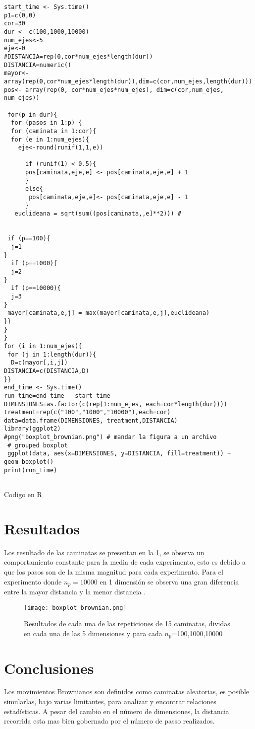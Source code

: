 \documentclass{article}
\renewcommand\lstlistingname{Código}
\begin{document}
\begin{listing}
\renewcommand\lstlistingname{Código}
\begin{verbatim}
start_time <- Sys.time()
p1=c(0,0)
cor=30
dur <- c(100,1000,10000)
num_ejes<-5
eje<-0
#DISTANCIA=rep(0,cor*num_ejes*length(dur))
DISTANCIA=numeric()
mayor<-array(rep(0,cor*num_ejes*length(dur)),dim=c(cor,num_ejes,length(dur)))
pos<- array(rep(0, cor*num_ejes*num_ejes), dim=c(cor,num_ejes, num_ejes))
 
 for(p in dur){
  for (pasos in 1:p) {
  for (caminata in 1:cor){
  for (e in 1:num_ejes){
    eje<-round(runif(1,1,e))
     
      if (runif(1) < 0.5){
      pos[caminata,eje,e] <- pos[caminata,eje,e] + 1
      }
      else{
       pos[caminata,eje,e]<- pos[caminata,eje,e] - 1
      }
   euclideana = sqrt(sum((pos[caminata,,e]**2))) # 
   
   
 if (p==100){
  j=1
}
  if (p==1000){
  j=2
}
  if (p==10000){
  j=3
}
 mayor[caminata,e,j] = max(mayor[caminata,e,j],euclideana)
}} 
}
}
for (i in 1:num_ejes){
 for (j in 1:length(dur)){
  D=c(mayor[,i,j])
DISTANCIA=c(DISTANCIA,D)
}}
end_time <- Sys.time()
run_time=end_time - start_time
DIMENSIONES=as.factor(c(rep(1:num_ejes, each=cor*length(dur))))
treatment=rep(c("100","1000","10000"),each=cor)
data=data.frame(DIMENSIONES, treatment,DISTANCIA)
library(ggplot2)
#png("boxplot_brownian.png") # mandar la figura a un archivo
 # grouped boxplot
 ggplot(data, aes(x=DIMENSIONES, y=DISTANCIA, fill=treatment)) +
geom_boxplot()
print(run_time)


\end{verbatim}
\caption{Codigo en R}
\label{listing:1}
\end{listing}
\section{Resultados}
Los resultado de las caminatas se presentan en la \ref{CBP_1}, se observa un comportamiento constante para la media de cada experimento, esto es debido a que los pasos son de la misma magnitud para cada experimento. Para el experimento donde $n_p=10000$ en 1 dimensión se observa una gran diferencia entre la mayor distancia y la menor distancia  .
\begin{figure}[h] %
    \centering
    \texttt{[image: boxplot\_brownian.png]} %
    \caption{Resultados de cada una de las repeticiones de 15 caminatas, dividas en cada una de las 5 dimensiones y para cada $n_p$=100,1000,10000 }
    \label{CBP_1}
\end{figure}
\section{Conclusiones}
Los movimientos Brownianos son definidos como caminatas aleatorias, es posible simularlas, bajo varias limitantes, para analizar y encontrar relaciones estadísticas. A pesar del cambio en el número de dimensiones, la distancia recorrida esta mas bien gobernada por el número de passo realizados. 


\end{document}
